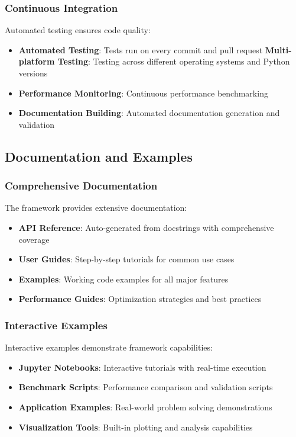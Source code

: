 \subsubsection{Continuous Integration}

Automated testing ensures code quality:

\begin{itemize}
    \item \textbf{Automated Testing}: Tests run on every commit and pull request
    \textbf{Multi-platform Testing}: Testing across different operating systems and Python versions
    \item \textbf{Performance Monitoring}: Continuous performance benchmarking
    \item \textbf{Documentation Building}: Automated documentation generation and validation
\end{itemize}

\subsection{Documentation and Examples}

\subsubsection{Comprehensive Documentation}

The framework provides extensive documentation:

\begin{itemize}
    \item \textbf{API Reference}: Auto-generated from docstrings with comprehensive coverage
    \item \textbf{User Guides}: Step-by-step tutorials for common use cases
    \item \textbf{Examples}: Working code examples for all major features
    \item \textbf{Performance Guides}: Optimization strategies and best practices
\end{itemize}

\subsubsection{Interactive Examples}

Interactive examples demonstrate framework capabilities:

\begin{itemize}
    \item \textbf{Jupyter Notebooks}: Interactive tutorials with real-time execution
    \item \textbf{Benchmark Scripts}: Performance comparison and validation scripts
    \item \textbf{Application Examples}: Real-world problem solving demonstrations
    \item \textbf{Visualization Tools}: Built-in plotting and analysis capabilities
\end{itemize}

